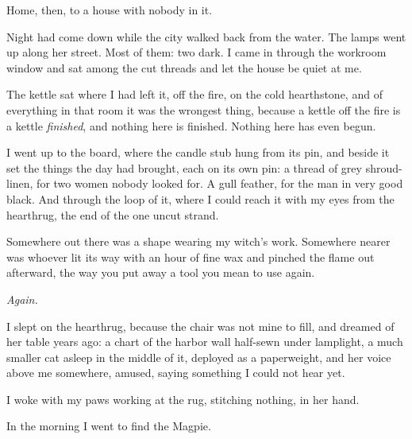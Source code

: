 \scenebreak

Home, then, to a house with nobody in it.

Night had come down while the city walked back from the water. The lamps went up along her street. Most of them: two dark. I came in through the workroom window and sat among the cut threads and let the house be quiet at me.

The kettle sat where I had left it, off the fire, on the cold hearthstone, and of everything in that room it was the wrongest thing, because a kettle off the fire is a kettle \emph{finished}, and nothing here is finished. Nothing here has even begun.

I went up to the board, where the candle stub hung from its pin, and beside it set the things the day had brought, each on its own pin: a thread of grey shroud-linen, for two women nobody looked for. A gull feather, for the man in very good black. And through the loop of it, where I could reach it with my eyes from the hearthrug, the end of the one uncut strand.

Somewhere out there was a shape wearing my witch's work. Somewhere nearer was whoever lit its way with an hour of fine wax and pinched the flame out afterward, the way you put away a tool you mean to use again.

\emph{Again.}

I slept on the hearthrug, because the chair was not mine to fill, and dreamed of her table years ago: a chart of the harbor wall half-sewn under lamplight, a much smaller cat asleep in the middle of it, deployed as a paperweight, and her voice above me somewhere, amused, saying something I could not hear yet.

I woke with my paws working at the rug, stitching nothing, in her hand.

In the morning I went to find the Magpie.
